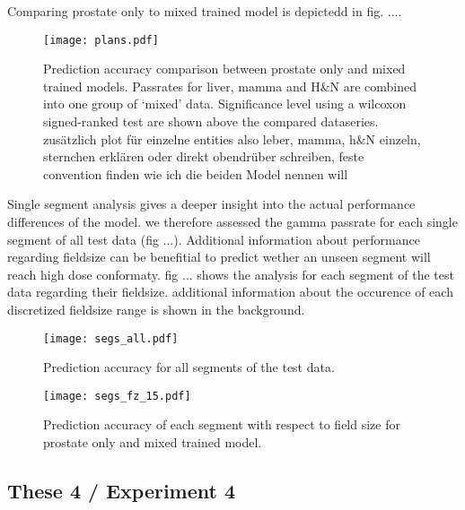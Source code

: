 Comparing prostate only to mixed trained model is depictedd in fig. .... 

\begin{figure}[ht]
    \centering
    \texttt{[image: plans.pdf]}
    \caption{Prediction accuracy comparison between prostate only and mixed trained models. Passrates for liver, mamma and H\&N are combined into one group of `mixed' data. Significance level using a wilcoxon signed-ranked test are shown above the compared dataseries. zusätzlich plot für einzelne entities also leber, mamma, h\&N einzeln, sternchen erklären oder direkt obendrüber schreiben, feste convention finden wie ich die beiden Model nennen will}\label{fig:comparison}
\end{figure}

Single segment analysis gives a deeper insight into the actual performance differences of the model. we therefore assessed the gamma passrate for each single segment of all test data (fig ...). Additional information about performance regarding fieldsize can be benefitial to predict wether an unseen segment will reach high dose conformaty. fig ... shows the analysis for each segment of the test data regarding their fieldsize. additional information about the occurence of each discretized fieldsize range is shown in the background. 

\begin{figure}
    \centering
    \texttt{[image: segs\_all.pdf]}
    \caption{Prediction accuracy for all segments of the test data.}\label{fig:all_test}
\end{figure}

\begin{figure}
    \centering
    \texttt{[image: segs\_fz\_15.pdf]}
    \caption{Prediction accuracy of each segment with respect to field size for prostate only and mixed trained model.}\label{fig:fz_test}
\end{figure}

\subsection{These 4 / Experiment 4}

